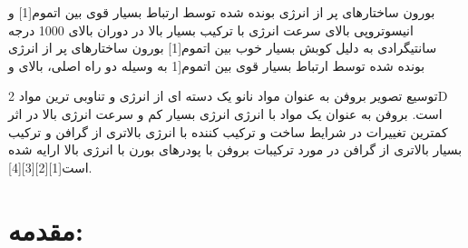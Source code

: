 بورون ساختارهای پر از انرژی بونده شده توسط ارتباط بسیار قوی بین اتموم[1] و انیسوتروپی بالای سرعت انرژی با ترکیب بسیار بالا در دوران بالای 1000 درجه سانتیگرادی به دلیل کوبش بسیار خوب بین اتموم[1] بورون ساختارهای پر از انرژی بونده شده توسط ارتباط بسیار قوی بین اتموم[1 به وسیله دو راه اصلی، بالای و

توسیع تصویر بروفن  به عنوان مواد نانو یک دسته ای از انرژی و تناوبی ترین مواد 2D است. بروفن به عنوان یک مواد با انرژی انرژی بسیار کم و سرعت انرژی بالا در اثر کمترین تغییرات در شرایط ساخت و ترکیب کننده با انرژی بالاتری از گرافن و ترکیب بسیار بالاتری از گرافن در مورد ترکیبات بروفن با پودرهای بورن با انرژی بالا ارایه شده است[1][2][3][4].

\section{مقدمه:}
